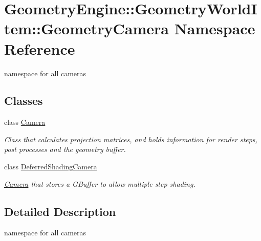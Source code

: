 \hypertarget{namespace_geometry_engine_1_1_geometry_world_item_1_1_geometry_camera}{}\section{Geometry\+Engine\+::Geometry\+World\+Item\+::Geometry\+Camera Namespace Reference}
\label{namespace_geometry_engine_1_1_geometry_world_item_1_1_geometry_camera}


namespace for all cameras  


\subsection*{Classes}
\begin{DoxyCompactItemize}
\item 
class \mbox{\hyperlink{class_geometry_engine_1_1_geometry_world_item_1_1_geometry_camera_1_1_camera}{Camera}}
\begin{DoxyCompactList}\small\item\em Class that calculates projection matrices, and holds information for render steps, post processes and the geometry buffer. \end{DoxyCompactList}\item 
class \mbox{\hyperlink{class_geometry_engine_1_1_geometry_world_item_1_1_geometry_camera_1_1_deferred_shading_camera}{Deferred\+Shading\+Camera}}
\begin{DoxyCompactList}\small\item\em \mbox{\hyperlink{class_geometry_engine_1_1_geometry_world_item_1_1_geometry_camera_1_1_camera}{Camera}} that stores a G\+Buffer to allow multiple step shading. \end{DoxyCompactList}\end{DoxyCompactItemize}


\subsection{Detailed Description}
namespace for all cameras 
